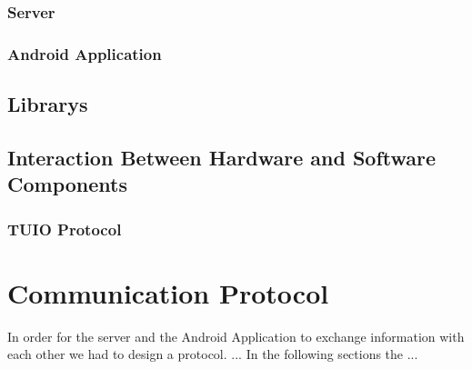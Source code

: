 \documentclass[a4paper,10pt]{report}
\begin{document}
		\subsubsection{Server}

		\subsubsection{Android Application}
		
	\subsection{Librarys}
	\subsection{Interaction Between Hardware and Software Components}
	
		\subsubsection{TUIO Protocol}
		
\section{Communication Protocol}
In order for the server and the Android Application to exchange information with each other we had to design a protocol.
...
In the following sections the ...
\end{document}
